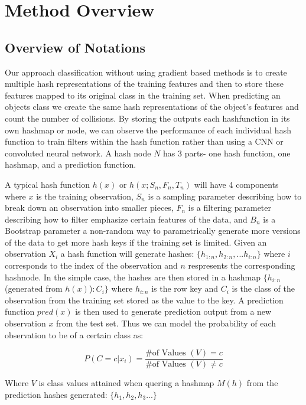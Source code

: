 \chapter{Method Overview}

\section{Overview of Notations}

Our approach classification without using gradient based methods is to create multiple hash representations of the training features and then to store these features mapped to its original class in the training set. When predicting an objects class we create the same hash representations of the object’s features and count the number of collisions. By storing the outputs each hashfunction in its own hashmap or node, we can observe the performance of each individual hash function to train filters within the hash function rather than using a CNN or convoluted neural network. A hash node $N$ has 3 parts- one hash function, one hashmap, and a prediction function. 

A typical hash function $h(x)$ or $h(x; S_n, F_n, T_n)$ will have 4 components where $x$ is the training observation, $S_n$ is a sampling parameter describing how to break down an observation into smaller pieces, $F_n$ is a filtering parameter describing how to filter emphasize certain features of the data, and $B_n$ is a Bootstrap parameter a non-random way to parametrically generate more versions of the data to get more hash keys if the training set is limited. Given an observation $X_i$ a hash function will generate hashes: $\{h_{1:n}, h_{2:n}, ... h_{i:n}\}$ where $i$ corresponds to the index of the observation and $n$ respresents the corresponding hashnode. In the simple case, the hashes are then stored in a hashmap $\{ h_{i:n}$ (generated from $h(x)$)$: C_i \}$ where $h_{i:n}$ is the row key and $C_i$ is the class of the observation from the training set stored as the value to the key. A prediction function $pred(x)$ is then used to generate prediction output from a new observation $x$ from the test set. Thus we can model the probability of each observation to be of a certain class as:

\begin{equation}P(C = c | x_i ) = \frac{ \textrm{\# of Values }(V) = c}{ \textrm{\# of Values }(V) \neq c }\end{equation}

Where $V$ is class values attained when quering a hashmap $M(h)$ from the prediction hashes generated: $\{h_1, h_2, h_3 ...\}$

